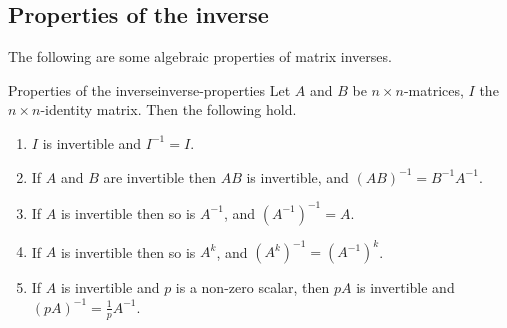 \subsection{Properties of the inverse}

The following are some algebraic properties of matrix inverses.

\begin{proposition}{Properties of the inverse}{inverse-properties}
  Let $A$ and $B$ be $n \times n$-matrices, $I$ the $n\times
  n$-identity matrix. Then the following hold.
  \begin{enumerate}
  \item $I$ is invertible and $I^{-1} = I$.
  \item If $A$ and $B$ are invertible then $AB$ is invertible, and
    $(AB)^{-1} = B^{-1}A^{-1}$.
  \item If $A$ is invertible then so is $A^{-1}$, and
    $(A^{-1})^{-1} = A$.
  \item If $A$ is invertible then so is $A^k$, and
    $(A^k)^{-1} = (A^{-1})^k$.
  \item If $A$ is invertible and $p$ is a non-zero scalar, then $pA$
    is invertible and $(pA)^{-1} = \frac{1}{p}A^{-1}$.
  \end{enumerate}
\end{proposition}

